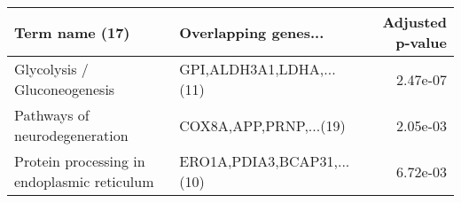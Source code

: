 \begin{tabular}{llr}
\toprule
                             Term name (17) &       Overlapping genes... &  Adjusted p-value \\
\midrule
               Glycolysis / Gluconeogenesis &   GPI,ALDH3A1,LDHA,...(11) &          2.47e-07 \\
              Pathways of neurodegeneration &     COX8A,APP,PRNP,...(19) &          2.05e-03 \\
Protein processing in endoplasmic reticulum & ERO1A,PDIA3,BCAP31,...(10) &          6.72e-03 \\
\bottomrule
\end{tabular}

